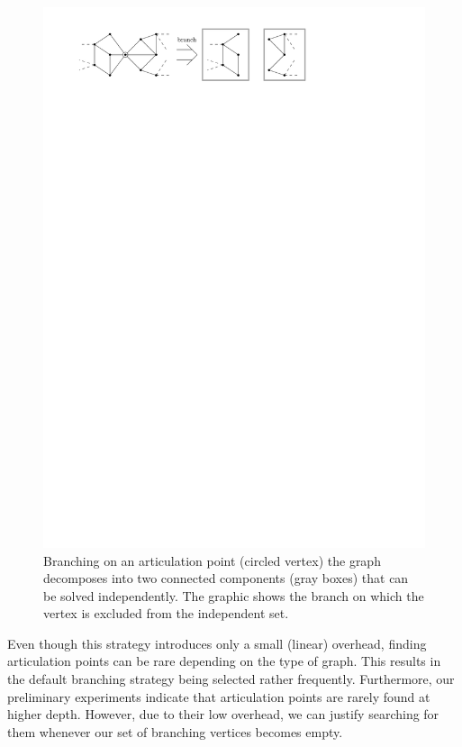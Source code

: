 \documentclass[a4paper,UKenglish,cleveref, autoref, thm-restate]{lipics-v2021}
\begin{document}
\begin{figure}[t]
  \centering
  \includegraphics[scale=1]{figures/articulation_points}
  \caption{Branching on an articulation point (circled vertex) the
    graph decomposes into two connected components (gray boxes) that can be
    solved independently. The graphic shows the branch on which the vertex is
    excluded from the independent set.}\label{fig:articulation_points}
\end{figure}

Even though this strategy introduces only a small (linear) overhead, finding articulation points can be rare depending on the type of graph.
This results in the default branching strategy being selected rather
frequently.
Furthermore, our preliminary experiments indicate that articulation points are rarely found at higher depth.
However, due to their low overhead, we can justify searching for them whenever
our set of branching vertices becomes empty.
\end{document}
